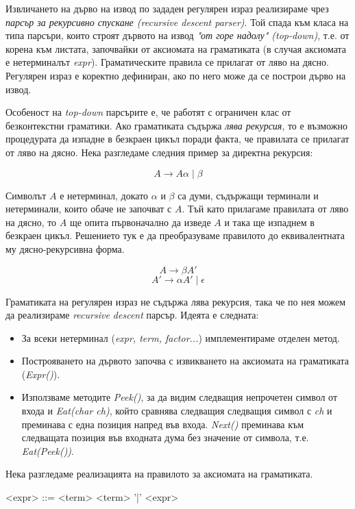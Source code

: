 \documentclass[12pt, oneside]{article}
\theoremstyle{definition}
\begin{document}
Извличането на дърво на извод по зададен регулярен израз реализираме чрез \emph{парсър за рекурсивно спускане (recursive descent parser)}. Той спада към класа на типа парсъри, които строят дървото на извод \emph{"от горе надолу" (top-down)}, т.е. от корена към листата, започвайки от аксиомата на граматиката (в случая аксиомата е нетерминалът \emph{expr}). Граматическите правила се прилагат от ляво на дясно. Регулярен израз е коректно дефиниран, ако по него може да се построи дърво на извод.

Особеност на \emph{top-down} парсърите е, че работят с ограничен клас от безконтекстни граматики. Ако граматиката съдържа \emph{лява рекурсия}, то е възможно процедурата да изпадне в безкраен цикъл поради факта, че правилата се прилагат от ляво на дясно. Нека разгледаме следния пример за директна рекурсия:

\[ A \to A \alpha \mid \beta \]

Символът \(A\) е нетерминал, докато \( \alpha \) и \( \beta \) са думи, съдържащи терминали и нетерминали, които обаче не започват с \(A\). Тъй като прилагаме правилата от ляво на дясно, то \(A\) ще опита първоначално да изведе \(A\) и така ще изпаднем в безкраен цикъл. Решението тук е да преобразуваме правилото до еквивалентната му дясно-рекурсивна форма.

\[ A \to \beta A' \]
\[ A' \to \alpha A' \mid \epsilon \]

Граматиката на регулярен израз не съдържа лява рекурсия, така че по нея можем  да реализираме \emph{recursive descent} парсър. Идеята е следната:

\begin{itemize}
	\item За всеки нетерминал (\emph{expr, term, factor...}) имплементираме отделен метод.
	\item Построяването на дървото започва с извикването на аксиомата на граматиката (\emph{Expr()}).
	\item Използваме методите \emph{Peek()}, за да видим следващия непрочетен символ от входа и \emph{Eat(char ch)}, който сравнява следващия следващия символ с \emph{ch} и преминава с една позиция напред във входа. \emph{Next()} преминава към следващата позиция във входната дума без значение от символа, т.е. \emph{Eat(Peek())}.
\end{itemize}

Нека разгледаме реализацията на правилото за аксиомата на граматиката.

\begin{grammar}
	<expr> ::= <term>
	\alt <term> '|' <expr>
\end{grammar}
\end{document}
